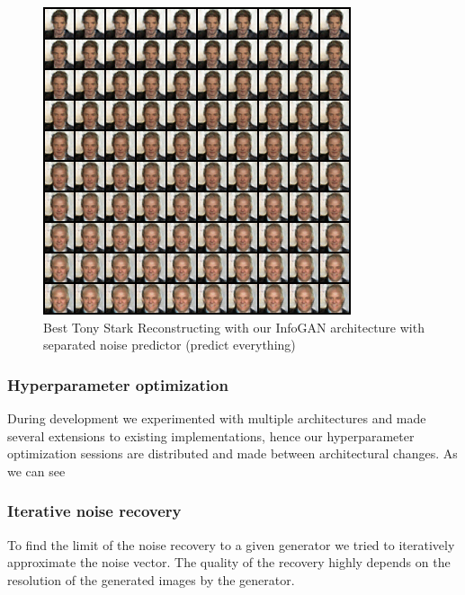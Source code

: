 \documentclass{egpubl}
\begin{document}
\begin{figure}[!htb]
	\centering
	\includegraphics[width=1\linewidth]{pic/predict_everything}
	\caption{Best Tony Stark Reconstructing with our InfoGAN architecture with separated noise predictor (predict everything)}
	\label{fig:best3}
\end{figure}



\subsubsection{Hyperparameter optimization}

During development we experimented with multiple architectures and made several extensions to existing implementations, hence our hyperparameter optimization sessions are distributed and made between architectural changes. As we can see 



\subsubsection{Iterative noise recovery}

To find the limit of the noise recovery to a given generator we tried to iteratively approximate the noise vector. The quality of the recovery highly depends on the resolution of the generated images by the generator.\\
\end{document}
